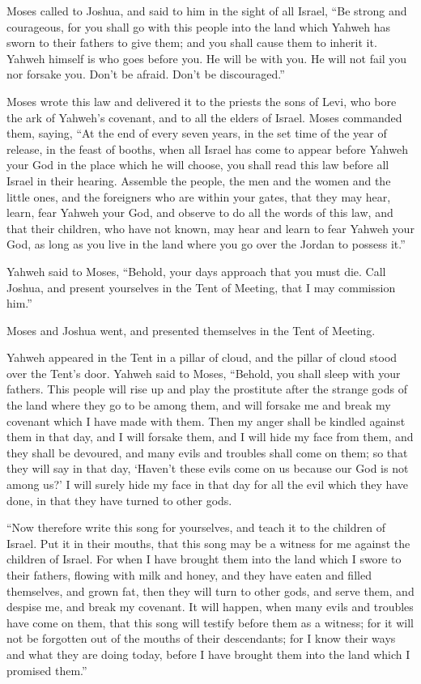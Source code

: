  Moses called to Joshua, and said to him in the sight of
all Israel, ``Be strong and courageous, for you shall go with this
people into the land which Yahweh has sworn to their fathers to give
them; and you shall cause them to inherit it.  Yahweh
himself is who goes before you. He will be with you. He will not fail
you nor forsake you. Don't be afraid. Don't be discouraged.''

 Moses wrote this law and delivered it to the priests the
sons of Levi, who bore the ark of Yahweh's covenant, and to all the
elders of Israel.  Moses commanded them, saying, ``At the
end of every seven years, in the set time of the year of release, in the
feast of booths,  when all Israel has come to appear
before Yahweh your God in the place which he will choose, you shall read
this law before all Israel in their hearing.  Assemble
the people, the men and the women and the little ones, and the
foreigners who are within your gates, that they may hear, learn, fear
Yahweh your God, and observe to do all the words of this law,
 and that their children, who have not known, may hear
and learn to fear Yahweh your God, as long as you live in the land where
you go over the Jordan to possess it.''

 Yahweh said to Moses, ``Behold, your days approach that
you must die. Call Joshua, and present yourselves in the Tent of
Meeting, that I may commission him.''

Moses and Joshua went, and presented themselves in the Tent of Meeting.

 Yahweh appeared in the Tent in a pillar of cloud, and
the pillar of cloud stood over the Tent's door.  Yahweh
said to Moses, ``Behold, you shall sleep with your fathers. This people
will rise up and play the prostitute after the strange gods of the land
where they go to be among them, and will forsake me and break my
covenant which I have made with them.  Then my anger
shall be kindled against them in that day, and I will forsake them, and
I will hide my face from them, and they shall be devoured, and many
evils and troubles shall come on them; so that they will say in that
day, `Haven't these evils come on us because our God is not among us?'
 I will surely hide my face in that day for all the evil
which they have done, in that they have turned to other gods.

 ``Now therefore write this song for yourselves, and
teach it to the children of Israel. Put it in their mouths, that this
song may be a witness for me against the children of Israel.
 For when I have brought them into the land which I swore
to their fathers, flowing with milk and honey, and they have eaten and
filled themselves, and grown fat, then they will turn to other gods, and
serve them, and despise me, and break my covenant.  It
will happen, when many evils and troubles have come on them, that this
song will testify before them as a witness; for it will not be forgotten
out of the mouths of their descendants; for I know their ways and what
they are doing today, before I have brought them into the land which I
promised them.''

